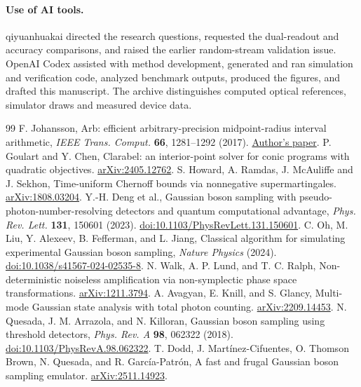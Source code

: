 \documentclass[11pt]{article}
\begin{document}
\paragraph{Use of AI tools.}
qiyuanhuakai directed the research questions, requested the dual-readout and accuracy comparisons, and raised the earlier random-stream validation issue. OpenAI Codex assisted with method development, generated and ran simulation and verification code, analyzed benchmark outputs, produced the figures, and drafted this manuscript. The archive distinguishes computed optical references, simulator draws and measured device data.

\begin{thebibliography}{99}\small
{} F. Johansson, Arb: efficient arbitrary-precision midpoint-radius interval arithmetic, \emph{IEEE Trans. Comput.} \textbf{66}, 1281--1292 (2017). \href{https://fredrikj.net/math/arbpaper.pdf}{Author's paper}.
 P. Goulart and Y. Chen, Clarabel: an interior-point solver for conic programs with quadratic objectives. \href{https://arxiv.org/abs/2405.12762}{arXiv:2405.12762}.
 S. Howard, A. Ramdas, J. McAuliffe and J. Sekhon, Time-uniform Chernoff bounds via nonnegative supermartingales. \href{https://arxiv.org/abs/1808.03204}{arXiv:1808.03204}.
 Y.-H. Deng et al., Gaussian boson sampling with pseudo-photon-number-resolving detectors and quantum computational advantage, \emph{Phys. Rev. Lett.} \textbf{131}, 150601 (2023). \href{https://doi.org/10.1103/PhysRevLett.131.150601}{doi:10.1103/PhysRevLett.131.150601}.
 C. Oh, M. Liu, Y. Alexeev, B. Fefferman, and L. Jiang, Classical algorithm for simulating experimental Gaussian boson sampling, \emph{Nature Physics} (2024). \href{https://doi.org/10.1038/s41567-024-02535-8}{doi:10.1038/s41567-024-02535-8}.
 N. Walk, A. P. Lund, and T. C. Ralph, Non-deterministic noiseless amplification via non-symplectic phase space transformations. \href{https://arxiv.org/abs/1211.3794}{arXiv:1211.3794}.
 A. Avagyan, E. Knill, and S. Glancy, Multi-mode Gaussian state analysis with total photon counting. \href{https://arxiv.org/abs/2209.14453}{arXiv:2209.14453}.
 N. Quesada, J. M. Arrazola, and N. Killoran, Gaussian boson sampling using threshold detectors, \emph{Phys. Rev. A} \textbf{98}, 062322 (2018). \href{https://doi.org/10.1103/PhysRevA.98.062322}{doi:10.1103/PhysRevA.98.062322}.
 T. Dodd, J. Mart\'inez-Cifuentes, O. Thomson Brown, N. Quesada, and R. Garc\'ia-Patr\'on, A fast and frugal Gaussian boson sampling emulator. \href{https://arxiv.org/abs/2511.14923}{arXiv:2511.14923}.

\end{thebibliography}
\end{document}
